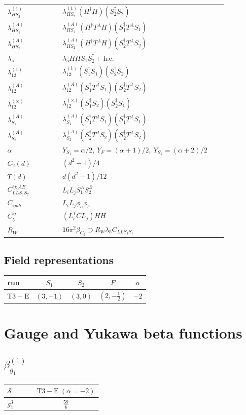 \documentclass[9pt]{article}
\begin{document}
\begin{longtable}{@{}p{0.23\linewidth}p{0.69\linewidth}@{}}
$\lambda_{HS_2}^{(1)}$ & $\lambda_{HS_2}^{(1)}(H^\dagger H)(S_2^\dagger S_2)$ \\
$\lambda_{HS_1}^{(A)}$ & $\lambda_{HS_1}^{(A)}(H^\dagger T^AH)(S_1^\dagger T^AS_1)$ \\
$\lambda_{HS_2}^{(A)}$ & $\lambda_{HS_2}^{(A)}(H^\dagger T^AH)(S_2^\dagger T^AS_2)$ \\
$\lambda_5$ & $\lambda_5HHS_1S_2^\dagger+\mathrm{h.c.}$ \\
$\lambda_{12}^{(1)}$ & $\lambda_{12}^{(1)}(S_1^\dagger S_1)(S_2^\dagger S_2)$ \\
$\lambda_{12}^{(A)}$ & $\lambda_{12}^{(A)}(S_1^\dagger T^AS_1)(S_2^\dagger T^AS_2)$ \\
$\lambda_{12}^{(\times)}$ & $\lambda_{12}^{(\times)}(S_1^\dagger S_2)(S_2^\dagger S_1)$ \\
$\lambda_{S_1}^{(A)}$ & $\lambda_{S_1}^{(A)}(S_1^\dagger T^A S_1)(S_1^\dagger T^A S_1)$ \\
$\lambda_{S_2}^{(A)}$ & $\lambda_{S_2}^{(A)}(S_2^\dagger T^A S_2)(S_2^\dagger T^A S_2)$ \\
$\alpha$ & $Y_{S_1}=\alpha/2,\ Y_F=(\alpha+1)/2,\ Y_{S_2}=(\alpha+2)/2$ \\
$C_2(d)$ & $(d^2-1)/4$ \\
$T(d)$ & $d(d^2-1)/12$ \\
$C_{LLS_1S_2}^{ij;AB}$ & $L_iL_jS_1^AS_2^B$ \\
$C_{ijab}$ & $L_iL_j\phi_a\phi_b$ \\
$C_5^{ij}$ & $(L_i^TCL_j)HH$ \\
$R_W$ & $16\pi^2\beta_{C_5}\supset R_W\lambda_5C_{LLS_1S_2}$ \\
\bottomrule
\end{longtable}
\subsection*{Field representations}
\begin{longtable}{@{}lcccc@{}}
\toprule
run & $S_1$ & $S_2$ & $F$ & $\alpha$ \\
\midrule
$\mathrm{T3-E}$ & $(3,-1)$ & $(3,0)$ & $(2,- \frac{1}{2})$ & $-2$ \\
\bottomrule
\end{longtable}
\section*{Gauge and Yukawa beta functions}
\subsection*{$ \beta_{g_1}^{(1)} $}
\begin{longtable}{@{}p{0.38\linewidth}c@{}}
\toprule
$\mathcal{S}$ & $ \mathrm{T3-E}\;(\alpha=-2) $ \\
\midrule
$ g_1^3 $ & $ \frac{59}{6} $ \\
\bottomrule
\end{longtable}
\end{document}

